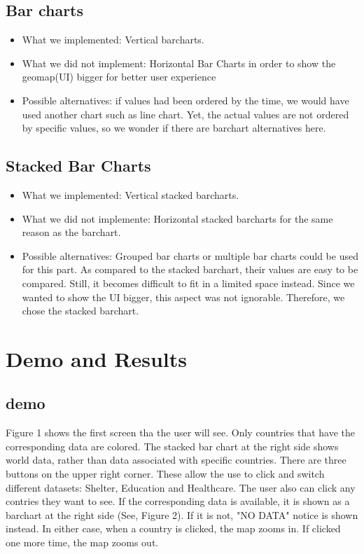 \documentclass[a4paper]{article}
\begin{document}
\subsection{Bar charts}
\begin{itemize}
\item What we implemented: 
Vertical barcharts.\\
\item What we did not implement: 
Horizontal Bar Charts in order to show the geomap(UI) bigger for better user experience\\
\item Possible alternatives: 
if values had been ordered by the time, we would have used another chart such as line chart. Yet, the actual values are not ordered by specific values, so we wonder if there are barchart alternatives here.
\end{itemize}

\subsection{Stacked Bar Charts}
\begin{itemize}
\item What we implemented: Vertical stacked barcharts.\\
\item What we did not implemente: Horizontal stacked barcharts for the same reason as the barchart.\\
\item Possible alternatives: Grouped bar charts or multiple bar charts could be used for this part. As compared to the stacked barchart, their values are easy to be compared. Still, it becomes difficult to fit in a limited space instead. Since we wanted to show the UI bigger, this aspect was not ignorable. Therefore, we chose the stacked barchart.
\end{itemize}

\section{Demo and Results}
\subsection{demo}
Figure 1 shows the first screen tha the user will see. Only countries that have the corresponding data are colored. The stacked bar chart at the right side shows world data, rather than data associated with specific countries. There are three buttons on the upper right corner. These allow the use to click and switch different datasets: Shelter, Education and Healthcare. The user also can click any contries they want to see. If the corresponding data is available, it is shown as a barchart at the right side (See, Figure 2). If it is not, "NO DATA" notice is shown instead. In either case, when a country is clicked, the map zooms in. If clicked one more time, the map zooms out.
\end{document}
